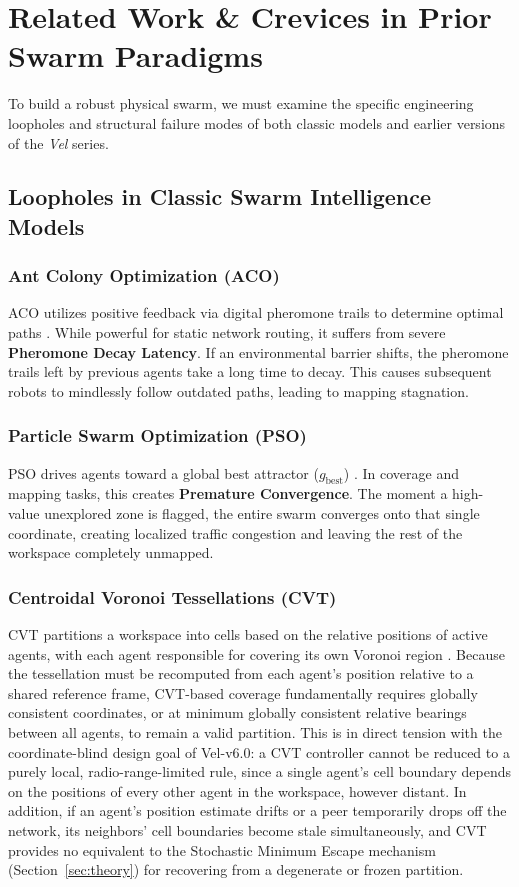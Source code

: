 \documentclass[journal,twoside]{IEEEtran}
\begin{document}
\section{Related Work \& Crevices in Prior Swarm Paradigms}
\label{sec:related}

To build a robust physical swarm, we must examine the specific engineering loopholes and structural failure modes of both classic models and earlier versions of the \textit{Vel} series.

\subsection{Loopholes in Classic Swarm Intelligence Models}
\subsubsection{Ant Colony Optimization (ACO)}
ACO utilizes positive feedback via digital pheromone trails to determine optimal paths \cite{dorigo2006ant}. While powerful for static network routing, it suffers from severe \textbf{Pheromone Decay Latency}. If an environmental barrier shifts, the pheromone trails left by previous agents take a long time to decay. This causes subsequent robots to mindlessly follow outdated paths, leading to mapping stagnation.

\subsubsection{Particle Swarm Optimization (PSO)}
PSO drives agents toward a global best attractor ($g_{\text{best}}$) \cite{gad2022pso}. In coverage and mapping tasks, this creates \textbf{Premature Convergence}. The moment a high-value unexplored zone is flagged, the entire swarm converges onto that single coordinate, creating localized traffic congestion and leaving the rest of the workspace completely unmapped.

\subsubsection{Centroidal Voronoi Tessellations (CVT)}
CVT partitions a workspace into cells based on the relative positions of active agents, with each agent responsible for covering its own Voronoi region \cite{cortes2004coverage}. Because the tessellation must be recomputed from each agent's position relative to a shared reference frame, CVT-based coverage fundamentally requires globally consistent coordinates, or at minimum globally consistent relative bearings between all agents, to remain a valid partition. This is in direct tension with the coordinate-blind design goal of Vel-v6.0: a CVT controller cannot be reduced to a purely local, radio-range-limited rule, since a single agent's cell boundary depends on the positions of every other agent in the workspace, however distant. In addition, if an agent's position estimate drifts or a peer temporarily drops off the network, its neighbors' cell boundaries become stale simultaneously, and CVT provides no equivalent to the Stochastic Minimum Escape mechanism (Section~\ref{sec:theory}) for recovering from a degenerate or frozen partition.
\end{document}
